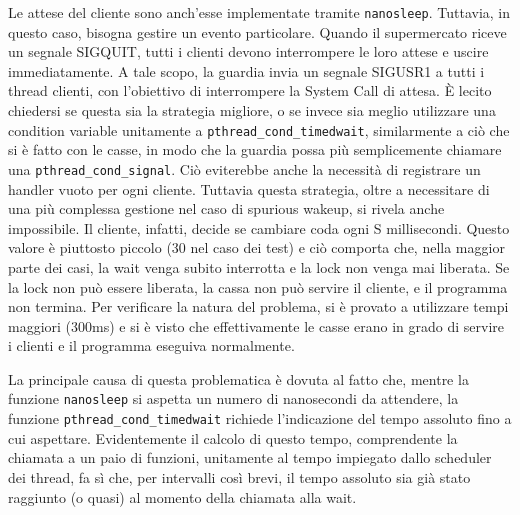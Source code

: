 \documentclass[a4paper,11pt] {article}
\begin{document}
Le attese del cliente sono anch'esse implementate tramite \lstinline{nanosleep}. Tuttavia, in questo caso, bisogna gestire un evento particolare. Quando il supermercato riceve un segnale SIGQUIT, tutti i clienti devono interrompere le loro attese e uscire immediatamente. A tale scopo, la guardia invia un segnale SIGUSR1 a tutti i thread clienti, con l'obiettivo di interrompere la System Call di attesa. È lecito chiedersi se questa sia la strategia migliore, o se invece sia meglio utilizzare una condition variable unitamente a \lstinline{pthread_cond_timedwait}, similarmente a ciò che si è fatto con le casse, in modo che la guardia possa più semplicemente chiamare una \lstinline{pthread_cond_signal}. Ciò eviterebbe anche la necessità di registrare un handler vuoto per ogni cliente. Tuttavia questa strategia, oltre a necessitare di una più complessa gestione nel caso di spurious wakeup, si rivela anche impossibile. Il cliente, infatti, decide se cambiare coda ogni S millisecondi. Questo valore è piuttosto piccolo (30 nel caso dei test) e ciò comporta che, nella maggior parte dei casi, la wait venga subito interrotta e la lock non venga mai liberata. Se la lock non può essere liberata, la cassa non può servire il cliente, e il programma non termina. Per verificare la natura del problema, si è provato a utilizzare tempi maggiori (300ms) e si è visto che effettivamente le casse erano in grado di servire i clienti e il programma eseguiva normalmente.

La principale causa di questa problematica è dovuta al fatto che, mentre la funzione \lstinline{nanosleep} si aspetta un numero di nanosecondi da attendere, la funzione \lstinline{pthread_cond_timedwait} richiede l'indicazione del tempo assoluto fino a cui aspettare. Evidentemente il calcolo di questo tempo, comprendente la chiamata a un paio di funzioni, unitamente al tempo impiegato dallo scheduler dei thread, fa sì che, per intervalli così brevi, il tempo assoluto sia già stato raggiunto (o quasi) al momento della chiamata alla wait.
\end{document}

